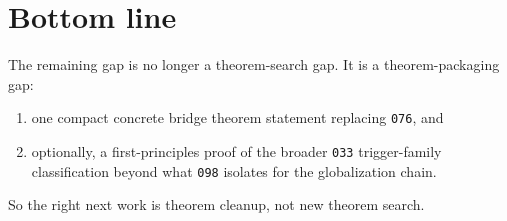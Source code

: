 \documentclass[11pt]{article}
\begin{document}
\section{Bottom line}

The remaining gap is no longer a theorem-search gap. It is a theorem-packaging
gap:
\begin{enumerate}[label=\textup{(\arabic*)},leftmargin=2.2em]
\item one compact concrete bridge theorem statement replacing \texttt{076}, and
\item optionally, a first-principles proof of the broader \texttt{033}
trigger-family classification beyond what \texttt{098} isolates for the
globalization chain.
\end{enumerate}

So the right next work is theorem cleanup, not new theorem search.
\end{document}
